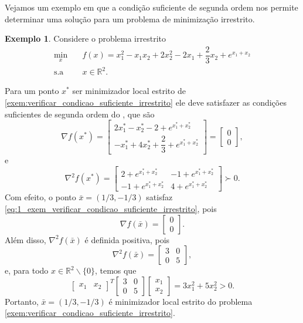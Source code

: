 \documentclass[12pt,a4paper]{scrartcl}
\def\RR{\mathds{R}}
\theoremstyle{definition}%
\newtheorem{exem}{Exemplo}
\begin{document}
Vejamos um exemplo em que a condição suficiente de segunda ordem nos permite determinar uma solução para um problema de minimização irrestrito.

\begin{exem}
Considere o problema irrestrito
\[\begin{aligned} \label{exem:verificar_condicao_suficiente_irrestrito}
\min_{x} & \quad f(x) = x_{1}^{2} - x_{1} x_{2} + 2x_{2}^{2} - 2x_{1} + \dfrac{2}{3}x_{2} + e^{x_{1}+x_{2}}  \\
\text{s.a} & \quad x\in \RR^{2} .
\end{aligned} \]
\end{exem}
Para um ponto $x^{*}$ ser minimizador local estrito de \eqref{exem:verificar_condicao_suficiente_irrestrito} ele deve satisfazer as condições suficientes de segunda ordem do , que são
\[ \label{eq:1_exem_verificar_condicao_suficiente_irrestrito}
\nabla f(x^{*}) = \begin{bmatrix*}
2x_{1}^{*} - x_{2}^{*} - 2 + e^{x_{1}^{*} +x_{2}^{*} } \\ -x_{1}^{*} + 4x_{2}^{*} + \dfrac{2}{3} + e^{x_{1}^{*} +x_{2}^{*} } 
\end{bmatrix*} =
\begin{bmatrix*}
0 \\ 0
\end{bmatrix*} ,
\]
e
\[ \label{eq:2_exem_verificar_condicao_suficiente_irrestrito}
\nabla^{2} f(x^{*}) = \begin{bmatrix*}
2 + e^{x_{1}^{*} +x_{2}^{*} } & -1 + e^{x_{1}^{*} +x_{2}^{*} } \\ -1 + e^{x_{1}^{*} +x_{2}^{*} } & 4 + e^{x_{1}^{*} +x_{2}^{*} }
\end{bmatrix*} \succ 0.
\]
Com efeito, o ponto $\bar{x} = (1/3, -1/3 )$ satisfaz \eqref{eq:1_exem_verificar_condicao_suficiente_irrestrito}, pois
\[
\nabla f(\bar{x}) = \begin{bmatrix*} 0 \\ 0 \end{bmatrix*} .
\]
Além disso, $\nabla^{2} f(\bar{x})$ é definida positiva, pois
\[
\nabla^{2} f(\bar{x}) = \begin{bmatrix*} 3 & 0 \\ 0 & 5 \end{bmatrix*},
\]
e, para todo $x \in \RR^{2}\backslash\{ 0\}$, temos que
\[
\begin{bmatrix*} x_{1} & x_{2} \end{bmatrix*}^{T} \begin{bmatrix*} 3 & 0 \\ 0 & 5 \end{bmatrix*} \begin{bmatrix*} x_{1} \\ x_{2} \end{bmatrix*} = 3x_{1}^{2} + 5x_{2}^{2} >0.
\]
Portanto, $\bar{x} = (1/3, -1/3 )$ é minimizador local estrito do problema \eqref{exem:verificar_condicao_suficiente_irrestrito}.
\end{document}
